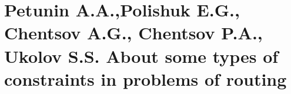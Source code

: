 \part{Petunin A.A.,Polishuk E.G., Chentsov A.G., Chentsov P.A., Ukolov S.S.
About some types of constraints in problems of routing}

